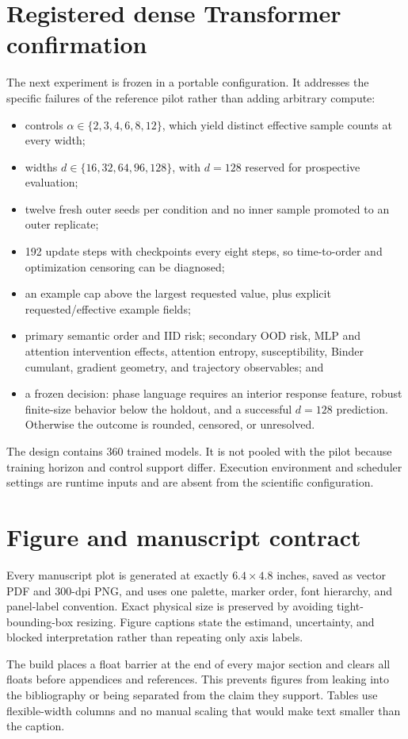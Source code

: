 \section{Registered dense Transformer confirmation}
\label{app:next-experiment}

The next experiment is frozen in a portable configuration. It addresses the
specific failures of the reference pilot rather than adding arbitrary compute:
\begin{itemize}
  \item controls $\alpha\in\{2,3,4,6,8,12\}$, which yield distinct effective
  sample counts at every width;
  \item widths $d\in\{16,32,64,96,128\}$, with $d=128$ reserved for
  prospective evaluation;
  \item twelve fresh outer seeds per condition and no inner sample promoted to
  an outer replicate;
  \item 192 update steps with checkpoints every eight steps, so time-to-order
  and optimization censoring can be diagnosed;
  \item an example cap above the largest requested value, plus explicit
  requested/effective example fields;
  \item primary semantic order and IID risk; secondary OOD risk, MLP and
  attention intervention effects, attention entropy, susceptibility, Binder
  cumulant, gradient geometry, and trajectory observables; and
  \item a frozen decision: phase language requires an interior response feature,
  robust finite-size behavior below the holdout, and a successful $d=128$
  prediction. Otherwise the outcome is rounded, censored, or unresolved.
\end{itemize}

The design contains 360 trained models. It is not pooled with the pilot because
training horizon and control support differ. Execution environment and scheduler
settings are runtime inputs and are absent from the scientific configuration.

\section{Figure and manuscript contract}
\label{app:figures}

Every manuscript plot is generated at exactly $6.4\times4.8$ inches, saved as
vector PDF and 300-dpi PNG, and uses one palette, marker order, font hierarchy,
and panel-label convention. Exact physical size is preserved by avoiding
tight-bounding-box resizing. Figure captions state the estimand, uncertainty,
and blocked interpretation rather than repeating only axis labels.

The build places a float barrier at the end of every major section and clears
all floats before appendices and references. This prevents figures from leaking
into the bibliography or being separated from the claim they support. Tables
use flexible-width columns and no manual scaling that would make text smaller
than the caption.

\FloatBarrier
